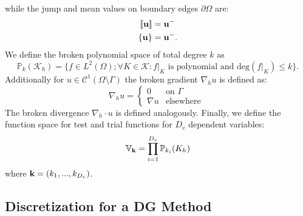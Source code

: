 while the jump and mean values on boundary edges $\partial \Omega$ are:
\begin{align}
\llbracket \textbf{u} \rrbracket &= \textbf{u}^- \\
\{\textbf{u}\} &= \textbf{u}^-.
\end{align}
We define the broken polynomial space of total degree $k$ as
\begin{equation}
\mathbb{P}_k(\mathcal{K}_h)= \{f \in L^2\left(\Omega\right); \forall K \in \mathcal{K}: f\vert_{K} \text{ is polynomial and deg}\left(f\vert_{K}\right)\leq k \}.
\label{Eq:PolSpace}
\end{equation}
Additionally for $u \in \mathcal{C}^1(\Omega \setminus \Gamma)$ the broken gradient $\nabla_h u$ is defined as:
\begin{equation}
\nabla_h u
= \begin{cases}
0
& \text{on }\Gamma\\
\nabla u
& \text{elsewhere }
\end{cases}
\end{equation}
The broken divergence  $\nabla_h \cdot u$ is defined analogously. Finally, we define the function space for test and trial functions for $D_v$ dependent variables:
\begin{equation}
\mathbb{V}_{\textbf{k}} = \prod_{i=1}^{D_v} \mathbb{P}_{k_i}(K_h)
\label{Eq:Vspace}
\end{equation}
where $\textbf{k} = \left(k_1,...,k_{D_v}\right)$. 



\subsection{Discretization for a DG Method}
\label{sec:discretDGmethod}

